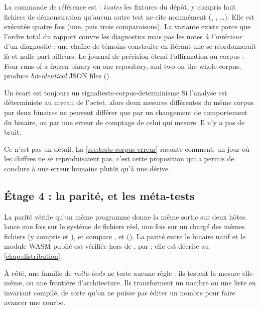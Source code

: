 La commande de référence est  : \emph{toutes} les fixtures du dépôt, y compris huit fichiers de démonstration qu'aucun autre test ne cite nommément (, , \ldots). Elle est exécutée quatre fois (une, puis trois comparaisons). La variante  existe parce que l'ordre total du rapport couvre les diagnostics mais pas les notes \emph{à l'intérieur} d'un diagnostic : une chaîne de témoins construite en itérant une  se réordonnerait là et nulle part ailleurs. Le journal de précision étend l'affirmation au corpus : \og Four runs of a frozen binary on one repository, and two on the whole corpus, produce \emph{bit-identical} JSON files\fg{} ().

\begin{proposition}{Un écart est toujours un signal}{tests-corpus-determinisme}
Si l'analyse est déterministe au niveau de l'octet, alors deux mesures différentes du même corpus par deux binaires ne peuvent différer que par un changement de comportement du binaire, ou par une erreur de comptage de celui qui mesure. Il n'y a pas de bruit.
\end{proposition}

Ce n'est pas un détail. La \cref{sec:tests-corpus-erreur} raconte comment, un jour où les chiffres ne se reproduisaient pas, c'est cette proposition qui a permis de conclure à une erreur humaine plutôt qu'à une dérive.

\subsection{Étage 4 : la parité, et les méta-tests}

La parité vérifie qu'un même programme donne la même sortie sur deux hôtes.  lance  une fois sur le système de fichiers réel, une fois sur un  chargé des mêmes fichiers (y compris  et ), et compare ,  et  (). La parité entre le binaire natif et le module WASM publié est vérifiée hors de , par  ; elle est décrite au \cref{chap:distribution}.

À côté, une famille de \emph{méta-tests} ne teste aucune règle : ils testent la mesure elle-même, ou une frontière d'architecture. Ils transforment un nombre ou une liste en invariant compilé, de sorte qu'on ne puisse pas \og éditer un nombre\fg{} pour faire avancer une courbe.

